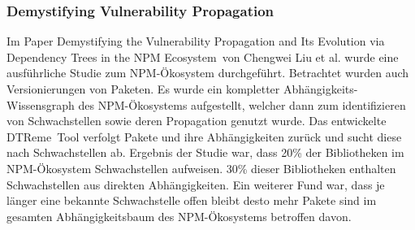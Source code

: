 \subsubsection{Demystifying Vulnerability Propagation} \label{sec:DVP}
    Im Paper \glqq Demystifying the Vulnerability Propagation and Its Evolution via Dependency Trees in the NPM Ecosystem\grqq~von Chengwei Liu et al. wurde eine ausführliche Studie zum NPM-Ökosystem durchgeführt. %
    Betrachtet wurden auch Versionierungen von Paketen.
    Es wurde ein kompletter Ab\-hängig\-keits-\-Wissens\-graph des NPM-Ökosystems aufgestellt, welcher dann zum identifizieren von Schwachstellen sowie deren Propagation genutzt wurde.
    Das entwickelte \glqq DTReme\grqq~Tool verfolgt Pakete und ihre Abhängigkeiten zurück und sucht diese nach Schwachstellen ab.
    Ergebnis der Studie war, dass 20\% der Bibliotheken im NPM-Ökosystem Schwachstellen aufweisen.
    30\% dieser Bibliotheken enthalten Schwachstellen aus direkten Abhängigkeiten.
    Ein weiterer Fund war, dass je länger eine bekannte Schwachstelle offen bleibt desto mehr Pakete sind im gesamten Abhängigkeitsbaum des NPM-Ökosystems betroffen davon. 
